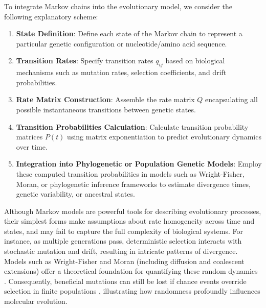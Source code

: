 To integrate Markov chains into the evolutionary model, we consider the following explanatory scheme:

\begin{enumerate}
    \item \textbf{State Definition}: Define each state of the Markov chain to represent a particular genetic configuration or nucleotide/amino acid sequence.
    \item \textbf{Transition Rates}: Specify transition rates $q_{ij}$ based on biological mechanisms such as mutation rates, selection coefficients, and drift probabilities.
    \item \textbf{Rate Matrix Construction}: Assemble the rate matrix $Q$ encapsulating all possible instantaneous transitions between genetic states.
    \item \textbf{Transition Probabilities Calculation}: Calculate transition probability matrices $P(t)$ using matrix exponentiation to predict evolutionary dynamics over time.
    \item \textbf{Integration into Phylogenetic or Population Genetic Models}: Employ these computed transition probabilities in models such as Wright-Fisher, Moran, or phylogenetic inference frameworks to estimate divergence times, genetic variability, or ancestral states.
\end{enumerate}

Although Markov models are powerful tools for describing evolutionary processes, their simplest forms make assumptions about rate homogeneity across time and states, and may fail to capture the full complexity of biological systems. For instance, as multiple generations pass, deterministic selection interacts with stochastic mutation and drift, resulting in intricate patterns of divergence. Models such as Wright-Fisher and Moran (including diffusion and coalescent extensions) offer a theoretical foundation for quantifying these random dynamics \cite{griffiths-marjoram1996}. Consequently, beneficial mutations can still be lost if chance events override selection in finite populations \cite{haldane1937effect}, illustrating how randomness profoundly influences molecular evolution.

